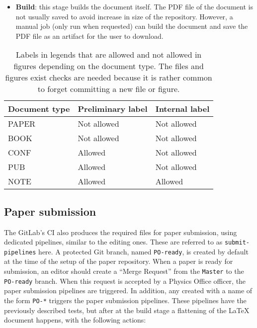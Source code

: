 \begin{itemize}
\item \textbf{Build}: this stage builds the document itself. The PDF file of the document is not usually saved to avoid increase in size of the repository.
However, a manual job (only run when requested) can build the document and save the PDF file as an artifact for the user to download.
\end{itemize}

\begin{table}[htb]
  \centering
  \begin{tabular}{lll}\toprule
    Document type & Preliminary label & Internal label \\
    \midrule
    PAPER & Not allowed & Not allowed \\
    BOOK & Not allowed & Not allowed \\
    CONF & Allowed & Not allowed \\
    PUB & Allowed & Not allowed \\
    NOTE & Allowed & Allowed \\
    \bottomrule
  \end{tabular}
  \caption{Labels in legends that are allowed and not allowed in figures depending on the document type.
  The files and figures exist checks are needed because it is rather common to forget committing a new file or figure.}%
  \label{tab:labels}
\end{table}

\subsection{Paper submission}%
\label{sec:Paper_submission}

The GitLab’s CI also produces the required files for paper submission, using dedicated pipelines, similar to the editing ones.
These are referred to as \texttt{submit-pipelines} here.
A protected Git branch, named \texttt{PO-ready}, is created by default at the time of the setup of the paper repository.
When a paper is ready for submission, an editor should create a \enquote{Merge Request}
from the \texttt{Master} to the \texttt{PO-ready} branch.
When this request is accepted by a Physics Office officer, the paper submission pipelines are triggered.
In addition, any  created with a name of the form \texttt{PO-*} triggers the paper submission pipelines.
These pipelines have the previously described tests, but after at the build stage a flattening of the LaTeX document happens, with the following actions:

